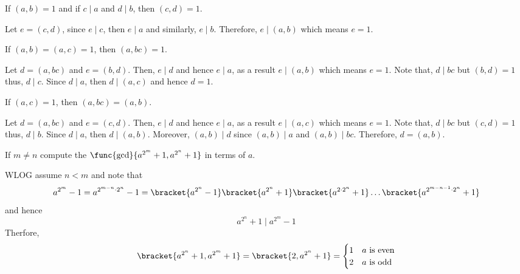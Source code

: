 \begin{exercise}
    \item If \((a,b) = 1\) and if \(c \mid a\) and \(d \mid b\), then \((c,d) = 1\).
    \begin{solution}
        Let \(e = (c,d)\), since \(e \mid c\), then \(e \mid a\) and similarly, \(e \mid b\). Therefore, \(e \mid (a,b)\) which means \(e = 1\).
    \end{solution} 
    \item If \((a,b) = (a,c) = 1\), then \((a,bc) = 1\).
    \begin{solution}
        Let \(d = (a,bc)\) and \(e = (b,d)\). Then, \(e \mid d\) and hence \(e \mid a\), as a result \(e \mid (a,b)\) which means \(e = 1\). Note that, \(d \mid bc\) but \((b,d) = 1\) thus, \(d \mid c\). Since \(d \mid a\), then \(d \mid (a,c)\) and hence \(d = 1\).
    \end{solution}
    \item If \((a,c) = 1\), then \((a,bc) = (a,b)\).
    \begin{solution}
        Let \(d = (a,bc)\) and \(e = (c,d)\). Then, \(e \mid d\) and hence \(e \mid a\), as a result \(e \mid (a,c)\) which means \(e = 1\). Note that, \(d \mid bc\) but \((c,d) = 1\) thus, \(d \mid b\). Since \(d \mid a\), then \(d \mid (a,b)\). Moreover, \((a,b) \mid d\) since \((a,b) \mid a\) and \((a,b) \mid bc\). Therefore, \(d = (a,b)\).
    \end{solution}
    \item If \(m \neq n\) compute the \(\func{\gcd}{a^{2^m} + 1, a^{2^n} + 1}\) in terms of \(a\). 
    \begin{solution}
        WLOG assume \(n < m\) and note that 
        \begin{equation*}
            a^{2^m} - 1 = a^{2^{m-n} \cdot 2^n} - 1 = \bracket{a^{2^n} - 1}  \bracket{a^{2^n} + 1} \bracket{a^{2 \cdot 2^n} + 1} \dots \bracket{a^{2^{m-n-1} \cdot 2^n} + 1} 
        \end{equation*}
        and hence 
        \begin{equation*}
            a^{2^n} + 1 \mid a^{2^m} - 1
        \end{equation*}
        Therfore, 
        \begin{equation*}
            \bracket{a^{2^n} + 1 , a^{2^m} + 1} = \bracket{2,a^{2^n} + 1} = \begin{cases}
                1 & a \text{ is even}\\
                2 & a \text{ is odd}
            \end{cases}

\end{equation*}
\end{solution}
\end{exercise}
